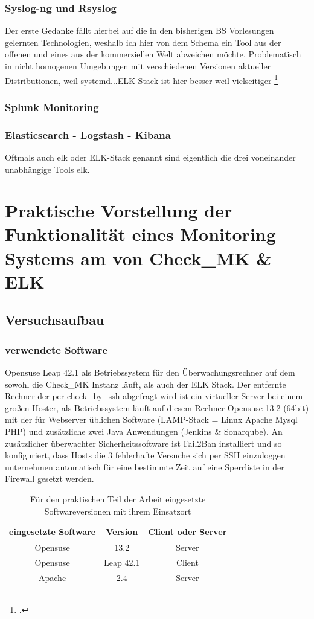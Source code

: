 \documentclass[12pt,a4paper,parskip]{scrreprt}
\begin{document}
	\subsection{Syslog-ng und Rsyslog}
	Der erste Gedanke fällt hierbei auf die in den bisherigen BS Vorlesungen gelernten Technologien, weshalb ich hier von dem Schema ein Tool aus der offenen und eines aus der kommerziellen Welt abweichen möchte.
	Problematisch in nicht homogenen Umgebungen mit verschiedenen Versionen aktueller Distributionen, weil systemd...ELK Stack ist hier besser weil vielseitiger
	\footcite{systemd2015}
	\subsection{Splunk Monitoring}
	\subsection{Elasticsearch - Logstash - Kibana}
	Oftmals auch \acrshort{elk} oder ELK-Stack genannt sind eigentlich die drei voneinander unabhängige Tools \acrlong{elk}. 
	\chapter{Praktische Vorstellung der Funktionalität eines Monitoring Systems am von Check\_MK \& ELK}
	\section{Versuchsaufbau}
	\subsection{verwendete Software}
	Opensuse Leap 42.1 als Betriebssystem für den Überwachungsrechner auf dem sowohl die Check\_MK Instanz läuft, als auch der ELK Stack. Der entfernte Rechner der per check\_by\_ssh abgefragt wird ist ein virtueller Server bei einem großen Hoster, als Betriebssystem läuft auf diesem Rechner Opensuse 13.2 (64bit) mit der für Webserver üblichen Software (LAMP-Stack = Linux Apache Mysql PHP) und zusätzliche zwei Java Anwendungen (Jenkins \& Sonarqube). An zusätzlicher überwachter Sicherheitssoftware ist Fail2Ban installiert und so konfiguriert, dass Hosts die 3 fehlerhafte Versuche sich per SSH einzuloggen unternehmen automatisch für eine bestimmte Zeit auf eine Sperrliste in der Firewall gesetzt werden. \\
	\begin{table}[h] %
	\begin{center}
	\begin{tabular}{|c|c|c|}
	\hline 
	eingesetzte Software & Version & Client oder Server \\ 
	\hline 
	Opensuse & 13.2 & Server\\ 
	\hline 
	Opensuse & Leap 42.1 & Client\\
	\hline
	Apache & 2.4 & Server\\
	\hline
	\end{tabular} 
	\caption[Eingesetzte Softwareversionen]{Für den praktischen Teil der Arbeit eingesetzte Softwareversionen mit ihrem Einsatzort}
	\end{center}
	\end{table}
\end{document}
